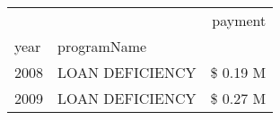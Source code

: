 \begin{tabular}{llr}
\toprule
 &  & payment \\
year & programName &  \\
\midrule
2008 & LOAN DEFICIENCY & \$ 0.19 M \\
\cline{1-3}
2009 & LOAN DEFICIENCY & \$ 0.27 M \\
\cline{1-3}
\bottomrule
\end{tabular}
